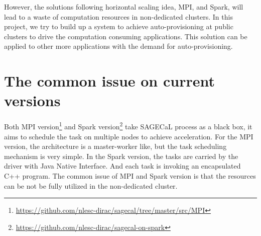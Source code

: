 \documentclass[sigchi]{acmart}
\begin{document}
However, the solutions following horizontal scaling idea, MPI, and Spark, will lead to a waste of computation resources in non-dedicated clusters.
In this project, we try to build up a system to achieve auto-provisioning at public clusters to drive the computation consuming applications. This solution can be applied to other more applications with the demand for auto-provisioning.
\section{The common issue on current versions}
Both MPI version\footnote{\url{https://github.com/nlesc-dirac/sagecal/tree/master/src/MPI}} and Spark version\footnote{\url{https://github.com/nlesc-dirac/sagecal-on-spark}} take SAGECaL process as a black box, it aims to schedule the task on multiple nodes to achieve acceleration. 
For the MPI version, the architecture is a master-worker like, but the task scheduling mechanism is very simple. In the Spark version, the tasks are carried by the driver with Java Native Interface. And each task is invoking an encapsulated C++ program.
The common issue of MPI and Spark version is that the resources can be not be fully utilized in the non-dedicated cluster. 
\end{document}
